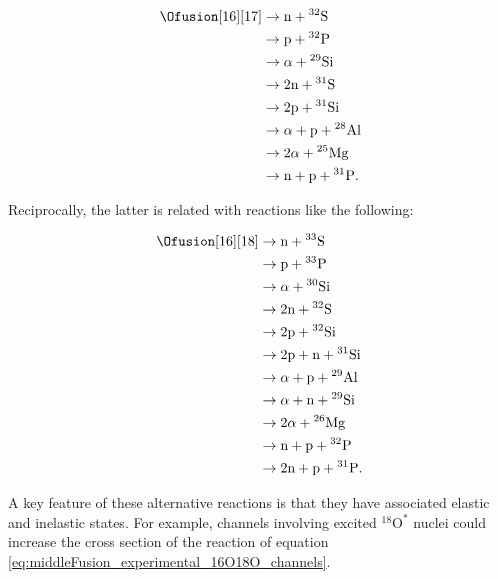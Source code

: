 \documentclass[openany]{book}
\begin{document}
\begin{equation}\label{eq:middleFusion_experimental_16O17O_channels}
	\begin{split}
		\Ofusion[16][17]  & \rightarrow \mathrm{n + {}^{32}S} \\
		&\rightarrow \mathrm{p + {}^{32}P} \\
		&\rightarrow \mathrm{\alpha + {}^{29}Si} \\
		&\rightarrow \mathrm{2n + {}^{31}S} \\
		&\rightarrow \mathrm{2p + {}^{31}Si} \\
		&\rightarrow \mathrm{\alpha + p + {}^{28}Al} \\
		&\rightarrow \mathrm{2\alpha + {}^{25}Mg} \\
		&\rightarrow \mathrm{n + p + {}^{31}P}. \\
	\end{split}
\end{equation}

Reciprocally, the latter is related with reactions like the following:

\begin{equation}\label{eq:middleFusion_experimental_16O18O_channels}
	\begin{split}
		\Ofusion[16][18] &\rightarrow \mathrm{n + {}^{33}S} \\ 
		&\rightarrow \mathrm{p + {}^{33}P} \\
		&\rightarrow \mathrm{\alpha + {}^{30}Si} \\
		&\rightarrow \mathrm{2n + {}^{32}S} \\
		&\rightarrow \mathrm{2p + {}^{32}Si} \\
		&\rightarrow \mathrm{2p + n + {}^{31}Si} \\
		&\rightarrow \mathrm{\alpha + p + {}^{29}Al} \\
		&\rightarrow \mathrm{\alpha + n + {}^{29}Si} \\
		&\rightarrow \mathrm{2\alpha + {}^{26}Mg} \\
		&\rightarrow \mathrm{n + p + {}^{32}P} \\
		&\rightarrow \mathrm{2n + p + {}^{31}P}. \\
	\end{split}
\end{equation}

A key feature of these alternative reactions is that they have associated elastic and inelastic states. For example, channels involving excited $\mathrm{{}^{18}O^{*}}$ nuclei could increase the cross section of the reaction of equation \ref{eq:middleFusion_experimental_16O18O_channels}.  \\
\end{document}
